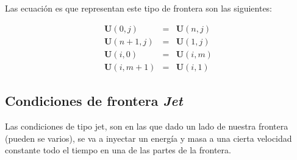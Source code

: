 \documentclass[12pt,a4paper]{book}
\begin{document}
Las ecuación  es que representan este tipo de frontera son las siguientes:

\begin{eqnarray}
\textbf{U}(0,j)&=&\textbf{U}(n,j) \\
\textbf{U}(n+1,j)&=&\textbf{U}(1,j) \\
\textbf{U}(i,0)&=&\textbf{U}(i,m) \\
\textbf{U}(i,m+1)&=&\textbf{U}(i,1) 
\end{eqnarray}


\subsection{Condiciones de frontera \emph{Jet} }

Las condiciones de tipo jet, son en las que dado un lado de nuestra frontera (pueden se varios), se va a inyectar un energía y masa a una cierta velocidad constante todo el tiempo en una de las partes de la frontera.
\end{document}
